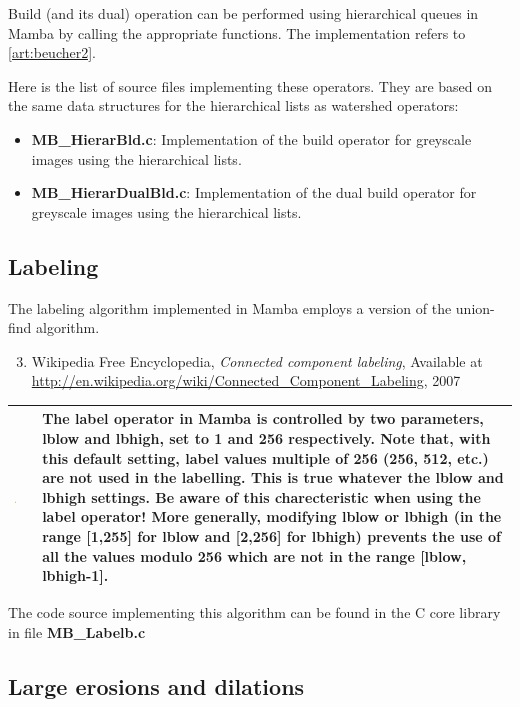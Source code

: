\documentclass[a4paper,10pt,oneside]{article}
\newenvironment{warnBox}
{
    \begin{center}
    \begin{tabular}{ | b{0.1\textwidth} b{0.8\textwidth} | }
    \hline
    \rowcolor{yellow}
    \includegraphics[width=0.1\textwidth]{Crystal_Clear_app_error.png} &
}
{
    \\
    \hline
    \end{tabular}
    \end{center}
}
\begin{document}
Build (and its dual) operation can be performed using hierarchical queues in
Mamba by calling the appropriate functions. The implementation refers to
\ref{art:beucher2}.

Here is the list of source files implementing these operators. They are based on
the same data structures for the hierarchical lists as watershed operators:

\begin{itemize}
\item \textbf{MB\_HierarBld.c}: Implementation of the build operator for
greyscale images using the hierarchical lists.
\item \textbf{MB\_HierarDualBld.c}: Implementation of the dual build operator
for greyscale images using the hierarchical lists.
\end{itemize}

\subsection{Labeling}

The labeling algorithm implemented in Mamba employs a version of the union-find 
algorithm.

\begin{enumerate}
\setcounter{enumi}{2}
\item \label{art:wikipedia} Wikipedia Free Encyclopedia, 
\emph{Connected component labeling},
Available at \url{http://en.wikipedia.org/wiki/Connected\_Component\_Labeling}, 2007
\end{enumerate}

\begin{warnBox}
The label operator in Mamba is controlled by two parameters, lblow and lbhigh, set to
1 and 256 respectively. Note that, with this default setting, label values multiple of 256
(256, 512, etc.) are not used in the labelling. This is true whatever the lblow and lbhigh
settings. Be aware of this charecteristic when using the label operator! More generally,
modifying lblow or lbhigh (in the range [1,255] for lblow and [2,256] for lbhigh) prevents
the use of all the values modulo 256 which are not in the range [lblow, lbhigh-1].
\end{warnBox}

The code source implementing this algorithm can be found in the C core library
in file \textbf{MB\_Labelb.c}

\subsection{Large erosions and dilations}
\label{cha:opt_ero_dil}
\end{document}
